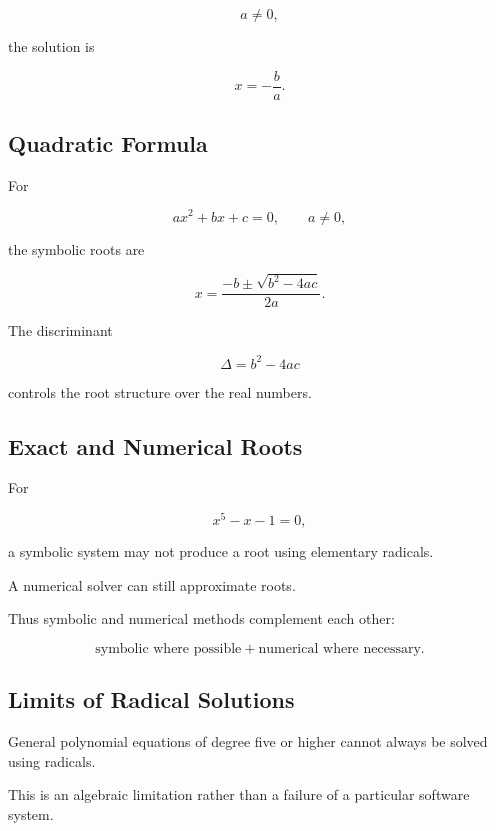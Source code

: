 \[
a\neq0,
\]

the solution is

\[
\boxed{
x=-\frac{b}{a}.
}
\]

\subsection{Quadratic Formula}
\label{subsec:symbolic-quadratic-formula}

For

\[
ax^2+bx+c=0,
\qquad
a\neq0,
\]

the symbolic roots are

\[
\boxed{
x
=
\frac{
-b\pm\sqrt{b^2-4ac}
}{
2a
}.
}
\]

The discriminant

\[
\boxed{
\Delta
=
b^2-4ac
}
\]

controls the root structure over the real numbers.

\subsection{Exact and Numerical Roots}
\label{subsec:exact-numerical-roots}

For

\[
x^5-x-1=0,
\]

a symbolic system may not produce a root using elementary radicals.

A numerical solver can still approximate roots.

Thus symbolic and numerical methods complement each other:

\[
\boxed{
\text{symbolic where possible}
+
\text{numerical where necessary}.
}
\]

\subsection{Limits of Radical Solutions}
\label{subsec:limits-of-radical-solutions}

General polynomial equations of degree five or higher cannot always be
solved using radicals.

This is an algebraic limitation rather than a failure of a particular
software system.

